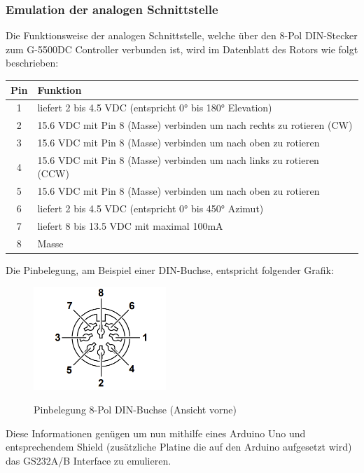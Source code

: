 \subsubsection{Emulation der analogen Schnittstelle}
Die Funktionsweise der analogen Schnittstelle, welche über den 8-Pol DIN-Stecker zum G-5500DC Controller verbunden ist, wird im Datenblatt des Rotors \cite{noauthor_yaesu_nodate} wie folgt beschrieben:

\begin{tabular}{| c | l |}
	\hline
	\textbf{Pin} & \textbf{Funktion} \\
	\hline
	1 & liefert 2 bis 4.5 VDC (entspricht 0° bis 180° Elevation) \\
	\hline
	2 & 15.6 VDC mit Pin 8 (Masse) verbinden um nach rechts zu rotieren (CW) \\
	\hline
	3 & 15.6 VDC mit Pin 8 (Masse) verbinden um nach oben zu rotieren \\
	\hline
	4 & 15.6 VDC mit Pin 8 (Masse) verbinden um nach links zu rotieren (CCW) \\
	\hline
	5 & 15.6 VDC mit Pin 8 (Masse) verbinden um nach oben zu rotieren \\
	\hline
	6 & liefert 2 bis 4.5 VDC (entspricht 0° bis 450° Azimut) \\
	\hline
	7 & liefert 8 bis 13.5 VDC mit maximal 100mA \\
	\hline
	8 & Masse \\
	\hline
\end{tabular}

Die Pinbelegung, am Beispiel einer DIN-Buchse, entspricht folgender Grafik: 
\begin{figure}[H]
	\cite{noauthor_yaesu_nodate}
	\centering
	\includegraphics[width=5cm]{../ref/RotorInterfacePinbelegung.png}
	\label{fig:Rotor_Interface_Pinbelegung}
	\caption{Pinbelegung 8-Pol DIN-Buchse (Ansicht vorne)}
\end{figure}

Diese Informationen genügen um nun mithilfe eines Arduino Uno und entsprechendem Shield (zusätzliche Platine die auf den Arduino aufgesetzt wird) das GS232A/B Interface zu emulieren.

